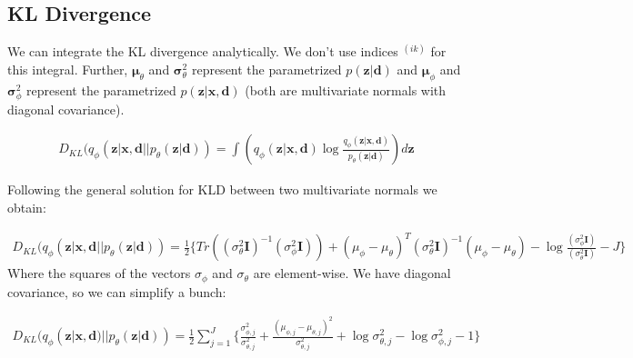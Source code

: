 \documentclass{article}
\begin{document}
\subsection{KL Divergence}

We can integrate the KL divergence analytically. We don't use indices $^{(ik)}$ for this integral. Further, $\mathbf{\mu}_\theta$ and $\mathbf{\sigma}_\theta^2$ represent the parametrized $p(\mathbf{z}|\mathbf{d})$ and $\mathbf{\mu}_\phi$ and $\mathbf{\sigma}_\phi^2$ represent the parametrized $p(\mathbf{z}|\mathbf{x},\mathbf{d})$ (both are multivariate normals with diagonal covariance).

\begin{align}
D_{KL}(q_\phi (\mathbf{z}| \mathbf{x}, \mathbf{d}||p_\theta (\mathbf{z}| \mathbf{d})) =
\int(q_\phi (\mathbf{z}| \mathbf{x}, \mathbf{d})\log \frac{q_\phi (\mathbf{z}| \mathbf{x}, \mathbf{d})}{p_\theta (\mathbf{z}| \mathbf{d})})d\mathbf{z}
\end{align}


Following the general solution for KLD between two multivariate normals we obtain:

\begin{align}
D_{KL}(q_\phi (\mathbf{z}| \mathbf{x}, \mathbf{d}||p_\theta (\mathbf{z}| \mathbf{d})) = \frac{1}{2}\{Tr((\sigma_\theta^2\mathbf{I})^{-1}(\sigma_\phi^2\mathbf{I})) + (\mu_\phi - \mu_\theta)^T(\sigma_\theta^2\mathbf{I})^{-1}(\mu_\phi - \mu_\theta) - \log\frac{(\sigma_\phi^2\mathbf{I})}{(\sigma_\theta^2\mathbf{I})} - J\}
\end{align}
Where the squares of the vectors $\sigma_\phi$ and $\sigma_\theta$ are element-wise. We have diagonal covariance, so we can simplify a bunch:

\begin{align}
D_{KL}(q_\phi (\mathbf{z}| \mathbf{x}, \mathbf{d})||p_\theta (\mathbf{z}| \mathbf{d})) = \frac{1}{2}\sum\limits_{j=1}^{J}\{\frac{\sigma_{\phi,j}^2}{\sigma_{\theta,j}^2} + \frac{(\mu_{\phi,j} - \mu_{\theta,j})^2}{\sigma_{\theta,j}^2} + \log \sigma_{\theta,j}^2 - \log \sigma_{\phi,j}^2 - 1\}
\end{align}
\end{document}
